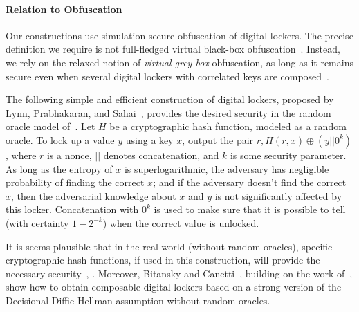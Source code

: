 \documentclass[11pt]{article}
\newcommand{\lemref}[1]{\mbox{Lemma~\ref{#1}}}
\begin{document}
\paragraph{Relation to Obfuscation} 
Our constructions use simulation-secure obfuscation of digital lockers. The precise definition we require is not full-fledged virtual black-box obfuscation~\cite{barak2001possibility}. Instead, we rely on the relaxed notion of \emph{virtual grey-box} obfuscation, as long as it remains secure even when several digital lockers with correlated keys are composed~\cite{bitansky2010strong}. 

The following simple and efficient construction of digital lockers, proposed by Lynn, Prabhakaran, and Sahai~\cite[Section 4]{lynn2004positive}, provides the desired security in the random oracle model of~\cite{DBLP:conf/ccs/BellareR93}. Let $H$ be a cryptographic hash function, modeled as a random oracle. To lock up a value $y$ using a key $x$, output the pair $r, H(r, x)\oplus (y||0^k)$, where $r$ is a nonce, $||$ denotes concatenation, and $k$ is some security parameter. As long as the entropy of $x$ is superlogarithmic, the adversary has negligible probability of finding the correct $x$; and if the adversary doesn't find the correct $x$, then the adversarial knowledge about $x$ and $y$ is not significantly affected by this locker.  Concatenation with $0^k$ is used to make sure that it is possible to tell (with certainty $1-2^{-k}$) when the correct value is unlocked. 

It is seems plausible that in the real world (without random oracles), specific cryptographic hash functions, if used in this construction, will provide the necessary security~\cite[Section 3.2]{canetti2008obfuscating}, \cite[Section 8.2.3]{dakdoukThesis}. 
Moreover, Bitansky and Canetti~\cite{bitansky2010strong}, building on the work of~\cite{canetti2008obfuscating,CKVW10}, show how to obtain composable digital lockers based on a strong version of the Decisional Diffie-Hellman assumption without random oracles.


\end{document}
